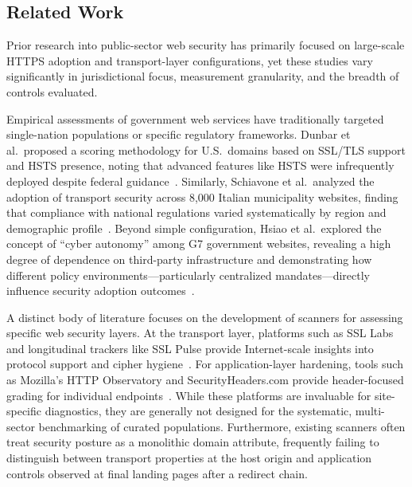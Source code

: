 \documentclass[a4paper,fleqn]{cas-sc}
\begin{document}

    \subsection{Related Work}
    Prior research into public-sector web security has primarily focused on large-scale HTTPS adoption and transport-layer configurations, yet these studies vary significantly in jurisdictional focus, measurement granularity, and the breadth of controls evaluated.
    
    Empirical assessments of government web services have traditionally targeted single-nation populations or specific regulatory frameworks. 
    Dunbar et al.\ proposed a scoring methodology for U.S.\ domains based on SSL/TLS support and HSTS presence, noting that advanced features like HSTS were infrequently deployed despite federal guidance~\cite{dunbar4240917survey}. 
    Similarly, Schiavone et al.\ analyzed the adoption of transport security across 8,000 Italian municipality websites, finding that compliance with national regulations varied systematically by region and demographic profile~\cite{schiavone2024municipality2https}. 
    Beyond simple configuration, Hsiao et al.\ explored the concept of ``cyber autonomy'' among G7 government websites, revealing a high degree of dependence on third-party infrastructure and demonstrating how different policy environments—particularly centralized mandates—directly influence security adoption outcomes~\cite{hsiao2019cyberautonomy}.
    
    A distinct body of literature focuses on the development of scanners for assessing specific web security layers. 
    At the transport layer, platforms such as SSL Labs and longitudinal trackers like SSL Pulse provide Internet-scale insights into protocol support and cipher hygiene~\cite{tool_ssllabs_ssltest,SSLPulse}. 
    For application-layer hardening, tools such as Mozilla's HTTP Observatory and SecurityHeaders.com provide header-focused grading for individual endpoints~\cite{tool_mozilla_observatory,tool_securityheaders}. 
    While these platforms are invaluable for site-specific diagnostics, they are generally not designed for the systematic, multi-sector benchmarking of curated populations. 
    Furthermore, existing scanners often treat security posture as a monolithic domain attribute, frequently failing to distinguish between transport properties at the host origin and application controls observed at final landing pages after a redirect chain.
    
\end{document}
